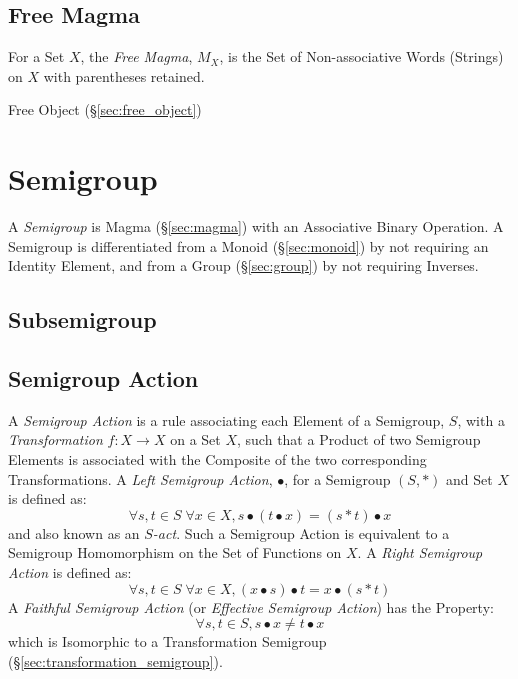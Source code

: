 \subsection{Free Magma}\label{sec:free_magma}

For a Set $X$, the \emph{Free Magma}, $M_X$, is the Set of
Non-associative Words (Strings) on $X$ with parentheses retained.

Free Object (\S\ref{sec:free_object})



\section{Semigroup}\label{sec:semigroup}

A \emph{Semigroup} is Magma (\S\ref{sec:magma}) with an Associative Binary
Operation. A Semigroup is differentiated from a Monoid (\S\ref{sec:monoid}) by
not requiring an Identity Element, and from a Group (\S\ref{sec:group}) by not
requiring Inverses.



\subsection{Subsemigroup}\label{sec:subsemigroup}

\subsection{Semigroup Action}\label{sec:semigroup_action}

A \emph{Semigroup Action} is a rule associating each Element of a
Semigroup, $S$, with a \emph{Transformation} $f : X \rightarrow X$ on
a Set $X$, such that a Product of two Semigroup Elements is associated
with the Composite of the two corresponding Transformations. A
\emph{Left Semigroup Action}, $\bullet$, for a Semigroup $(S,*)$ and
Set $X$ is defined as:
\[
  \forall s,t \in S\;\forall x \in X, s \bullet (t \bullet x) = (s * t)
  \bullet x
\]
and also known as an \emph{$S$-act}. Such a Semigroup Action is
equivalent to a Semigroup Homomorphism on the Set of Functions on $X$.
A \emph{Right Semigroup Action} is defined as:
\[
  \forall s,t \in S\;\forall x \in X, (x \bullet s) \bullet t = x
  \bullet (s * t)
\]
A \emph{Faithful Semigroup Action} (or \emph{Effective Semigroup
  Action}) has the Property:
\[
  \forall s, t \in S, s \bullet x \neq t \bullet x
\]
which is Isomorphic to a Transformation Semigroup
(\S\ref{sec:transformation_semigroup}).



